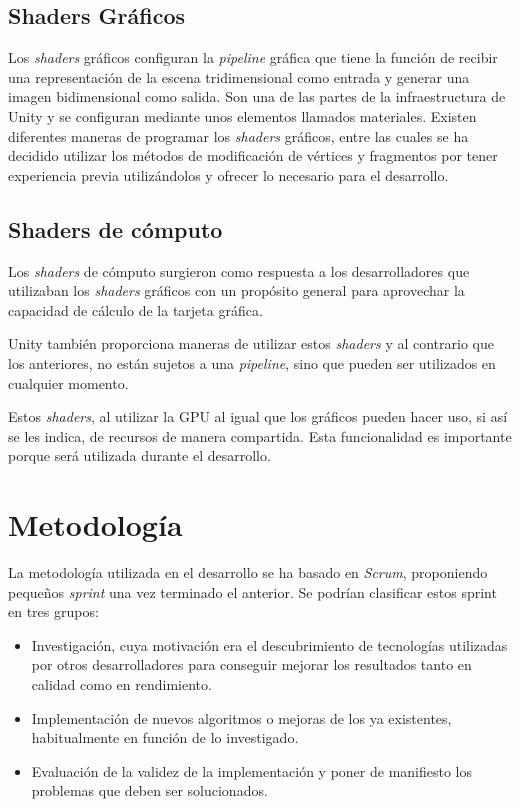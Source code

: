 \subsection{Shaders Gráficos}
Los \textit{shaders} gráficos configuran la \textit{pipeline} gráfica que tiene la función de recibir una representación de la escena tridimensional como entrada y generar una imagen bidimensional como salida. 
Son una de las partes de la infraestructura de Unity y se configuran mediante unos elementos llamados materiales. Existen diferentes maneras de programar los \textit{shaders} gráficos, entre las cuales se ha decidido utilizar los métodos de modificación de vértices y fragmentos por tener experiencia previa utilizándolos y ofrecer lo necesario para el desarrollo.

\subsection{Shaders de cómputo}
Los \textit{shaders} de cómputo surgieron como respuesta a los desarrolladores que utilizaban los \textit{shaders} gráficos con un propósito general para aprovechar la capacidad de cálculo de la tarjeta gráfica.

Unity también proporciona maneras de utilizar estos \textit{shaders} y al contrario que los anteriores, no están sujetos a una \textit{pipeline}, sino que pueden ser utilizados en cualquier momento.

Estos \textit{shaders}, al utilizar la GPU al igual que los gráficos pueden hacer uso, si así se les indica, de recursos de manera compartida. Esta funcionalidad es importante porque será utilizada durante el desarrollo.


\section{Metodología}
La metodología utilizada en el desarrollo se ha basado en \textit{Scrum}, proponiendo pequeños \textit{sprint} una vez terminado el anterior. Se podrían clasificar estos sprint en tres grupos:

\begin{itemize}
\item Investigación, cuya motivación era el descubrimiento de tecnologías utilizadas por otros desarrolladores para conseguir mejorar los resultados tanto en calidad como en rendimiento.
\item Implementación de nuevos algoritmos o mejoras de los ya existentes, habitualmente en función de lo investigado.
\item Evaluación de la validez de la implementación y poner de manifiesto los problemas que deben ser solucionados.
\end{itemize}

